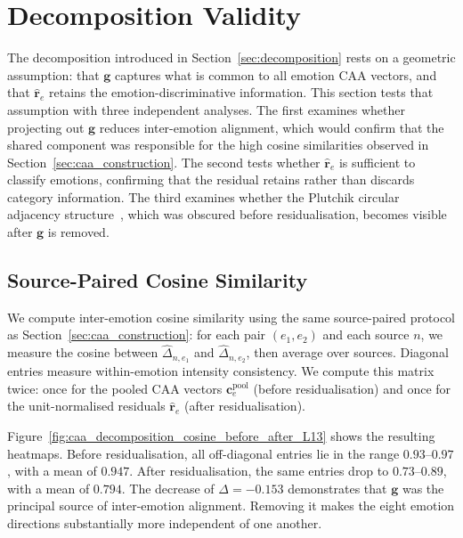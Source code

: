 \section{Decomposition Validity}
\label{sec:decomposition_validity}

The decomposition introduced in Section~\ref{sec:decomposition} rests on a geometric assumption: that $\mathbf{g}$ captures what is common to all emotion CAA vectors, and that $\hat{\mathbf{r}}_e$ retains the emotion-discriminative information. This section tests that assumption with three independent analyses. The first examines whether projecting out $\mathbf{g}$ reduces inter-emotion alignment, which would confirm that the shared component was responsible for the high cosine similarities observed in Section~\ref{sec:caa_construction}. The second tests whether $\hat{\mathbf{r}}_e$ is sufficient to classify emotions, confirming that the residual retains rather than discards category information. The third examines whether the Plutchik circular adjacency structure~\cite{plutchik1980emotion}, which was obscured before residualisation, becomes visible after $\mathbf{g}$ is removed.\par

\subsection{Source-Paired Cosine Similarity}

We compute inter-emotion cosine similarity using the same source-paired protocol as Section~\ref{sec:caa_construction}: for each pair $(e_1, e_2)$ and each source $n$, we measure the cosine between $\hat{\Delta}_{n,e_1}$ and $\hat{\Delta}_{n,e_2}$, then average over sources. Diagonal entries measure within-emotion intensity consistency. We compute this matrix twice: once for the pooled CAA vectors $\mathbf{c}^{\mathrm{pool}}_{e}$ (before residualisation) and once for the unit-normalised residuals $\hat{\mathbf{r}}_e$ (after residualisation).\par

Figure~\ref{fig:caa_decomposition_cosine_before_after_L13} shows the resulting heatmaps. Before residualisation, all off-diagonal entries lie in the range $0.93$--$0.97$, with a mean of $0.947$. After residualisation, the same entries drop to $0.73$--$0.89$, with a mean of $0.794$. The decrease of $\Delta = -0.153$ demonstrates that $\mathbf{g}$ was the principal source of inter-emotion alignment. Removing it makes the eight emotion directions substantially more independent of one another.\par

